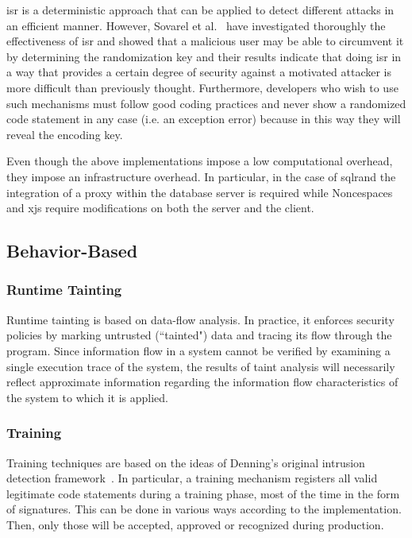 \documentclass[conference]{IEEEtran}
\begin{document}
{\sc isr} is a deterministic approach that can be applied
to detect different attacks in an efficient manner.
However, Sovarel et al.~\cite{SEP05}
have investigated thoroughly the effectiveness
of {\sc isr} and showed that a malicious user
may be able to circumvent it by determining
the randomization key and their results
indicate that doing {\sc isr} in a way that
provides a certain degree of security against a motivated
attacker is more difficult than previously thought.
Furthermore, developers who wish to use
such mechanisms must follow good coding practices
and never show a randomized code statement in any case
(i.e. an exception error) because in this way
they will reveal the encoding key.

Even though the above implementations impose a low
computational overhead, they impose an infrastructure
overhead. In particular, in the case of {\sc sql}rand
the integration of a proxy within the database server
is required while Noncespaces and x{\sc js} require
modifications on both the server and the client.

\subsection{Behavior-Based}

\subsubsection{Runtime Tainting}

Runtime tainting is based on data-flow analysis.
In practice, it enforces security policies by marking untrusted
(``tainted") data and tracing its flow through the program.
Since information flow in a system cannot be verified by examining
a single execution trace of the system, the results of taint
analysis will necessarily reflect approximate information regarding
the information flow characteristics of the system to which it is applied.

\subsubsection{Training}

Training techniques are based on the ideas of Denning's original
intrusion detection framework~\cite{Den87}. In particular, a training
mechanism registers all valid legitimate code statements during a
training phase, most of the time in the form of signatures. This can
be done in various ways according to the implementation. Then, only
those will be accepted, approved or recognized during production.
\end{document}
